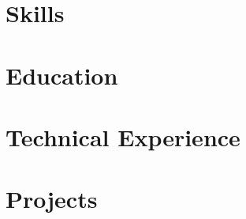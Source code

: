 \documentclass[10pt]{article}
\begin{document}
\pagestyle{others}\thispagestyle{first_page}



\section{Skills}


\section{Education}


\section{Technical Experience}


\section{Projects}




% 
\end{document}

